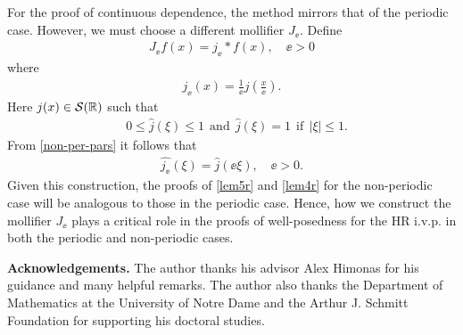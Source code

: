 For the proof of continuous dependence, the method mirrors that 
of the periodic case. However, we must choose a different mollifier 
$J_\ee$. Define
\begin{equation}
\begin{split}
J_\ee f(x) = j_\ee * f(x), \quad \ee>0
\end{split}
\end{equation}
%
%
where 
\begin{equation}
	\label{non-per-pars}
\begin{split}
j_\ee(x) = \frac{1}{\ee} j \left (\frac{x}{\ee} \right ).
\end{split}
\end{equation}
Here
$j(x) \in \mathcal{S}(\mathbb{R})$ such that
%
%
\begin{equation}
\begin{split}
	& 0 \le \widehat{j}(\xi) \le 1 \ \ \text{and}
	\ \ \widehat{j}(\xi) = 1 \ \ \text{if} \ \ |\xi| \le 1.
\end{split}
\end{equation}
%
%
%
%
%
%
%
%
From \eqref{non-per-pars} it follows that 
%
%
\begin{equation}
\begin{split}
\widehat{j_\ee}(\xi) = \widehat{j }(\ee \xi), \quad \ee > 0.
\end{split}
\end{equation}
%
%
%
%
Given this construction, the proofs of \cref{lem5r} and 
\cref{lem4r} for the non-periodic case will be
analogous to those in the periodic case.
Hence, how we
construct the mollifier $J_\ee$ plays a critical role in the proofs of
well-posedness for the HR i.v.p. in both the periodic and non-periodic 
cases. %

\textbf{Acknowledgements.} The author thanks his advisor Alex Himonas for 
his guidance and many helpful remarks. The author also thanks the Department of 
Mathematics at the University of Notre Dame and the Arthur J. Schmitt Foundation for 
supporting his doctoral 
studies.
%
%
%
